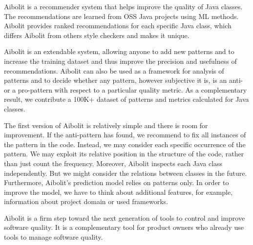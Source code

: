Aibolit is a recommender system that helps improve the quality of Java classes. 
The recommendations are learned from OSS Java projects using ML methods.
Aibolit provides ranked recommendations for each specific Java class, 
which differs Aibolit from others style checkers and makes it unique.

Aibolit is an extendable system, allowing anyone to add new patterns and to 
increase the training dataset and thus improve the precision and usefulness 
of recommendations. Aibolit can also be used as a framework for analysis of 
patterns and to decide whether any pattern, however subjective it is, is an anti- or a pro-pattern
with respect to a particular quality metric. As a complementary result, 
we contribute a 100K+ dataset of patterns and metrics calculated for Java classes.

The first version of Aibolit is relatively simple and there is room
for improvement. If the anti-pattern has found, we recommend to fix all instances 
of the pattern in the code. Instead, we may consider each specific occurrence of the pattern. 
We may exploit its relative position in the structure of the code, rather than just count 
the frequency. Moreover, Aibolit inspects each Java class independently. But 
we might consider the relations between classes in the future. Furthermore, 
Aibolit's prediction model relies on patterns only. In order to improve the model, 
we have to think about additional features, for example, information about 
project domain or used frameworks.

Aibolit is a firm step toward the next generation of tools to control
and improve software quality. It is a complementary tool for 
product owners who already use tools to manage software quality.



